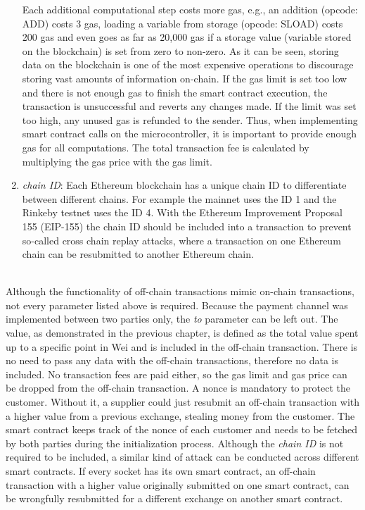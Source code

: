 \begin{enumerate}
  Each additional computational step costs more gas, e.g., an addition (opcode: ADD) costs 3 gas, loading a variable from storage (opcode: SLOAD) costs 200 gas and even goes as far as 20,000 gas if a storage value (variable stored on the blockchain) is set from zero to non-zero.
  As it can be seen, storing data on the blockchain is one of the most expensive operations to discourage storing vast amounts of information on-chain.
  If the gas limit is set too low and there is not enough gas to finish the smart contract execution, the transaction is unsuccessful and reverts any changes made.
  If the limit was set too high, any unused gas is refunded to the sender.
  Thus, when implementing smart contract calls on the microcontroller, it is important to provide enough gas for all computations.
  The total transaction fee is calculated by multiplying the gas price with the gas limit.
  \item \textit{chain ID}: Each Ethereum blockchain has a unique chain ID to differentiate between different chains.
  For example the mainnet uses the ID 1 and the Rinkeby testnet uses the ID 4.
  With the Ethereum Improvement Proposal 155 (EIP-155)\cite{eip-155} the chain ID should be included into a transaction to prevent so-called cross chain replay attacks, where a transaction on one Ethereum chain can be resubmitted to another Ethereum chain.
\end{enumerate}
\leavevmode
\\
Although the functionality of off-chain transactions mimic on-chain transactions, not every parameter listed above is required.
Because the payment channel was implemented between two parties only, the \textit{to} parameter can be left out.
The value, as demonstrated in the previous chapter, is defined as the total value spent up to a specific point in Wei and is included in the off-chain transaction.
There is no need to pass any data with the off-chain transactions, therefore no data is included.
No transaction fees are paid either, so the gas limit and gas price can be dropped from the off-chain transaction.
A nonce is mandatory to protect the customer. Without it, a supplier could just resubmit an off-chain transaction with a higher value from a previous exchange, stealing money from the customer. The smart contract keeps track of the nonce of each customer and needs to be fetched by both parties during the initialization process.
Although the \textit{chain ID} is not required to be included, a similar kind of attack can be conducted across different smart contracts.
If every socket has its own smart contract, an off-chain transaction with a higher value originally submitted on one smart contract, can be wrongfully resubmitted for a different exchange on another smart contract.
